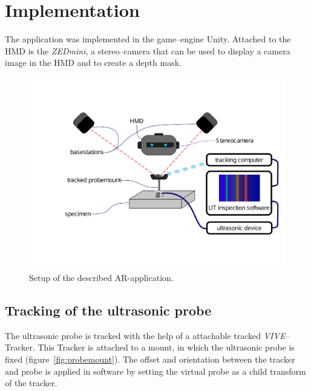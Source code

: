\documentclass{VRARWorkshop}
\begin{document}
\section{Implementation}
The application was implemented in the game--engine Unity.
Attached to the HMD is the \textit{ZEDmini}, a stereo--camera that can be used to display a camera image in the HMD and to create a depth mask.

\cite{dorner_virtual_2013}

\begin{figure}[h!]
    \begin{center}
        \includegraphics[width=158mm]{images/Setup-ARUS}
        \caption{\label{fig:Setup} Setup of the described AR-application.}
    \end{center}
\end{figure}

\subsection{Tracking of the ultrasonic probe}
The ultrasonic probe is tracked with the help of a attachable tracked \textit{VIVE}--Tracker.
This Tracker is attached to a mount, in which the ultrasonic probe is fixed (figure~\ref{fig:probemount}).
The offset and orientation between the tracker and probe is applied in software by setting the virtual probe as a child transform of the tracker.
\end{document}
